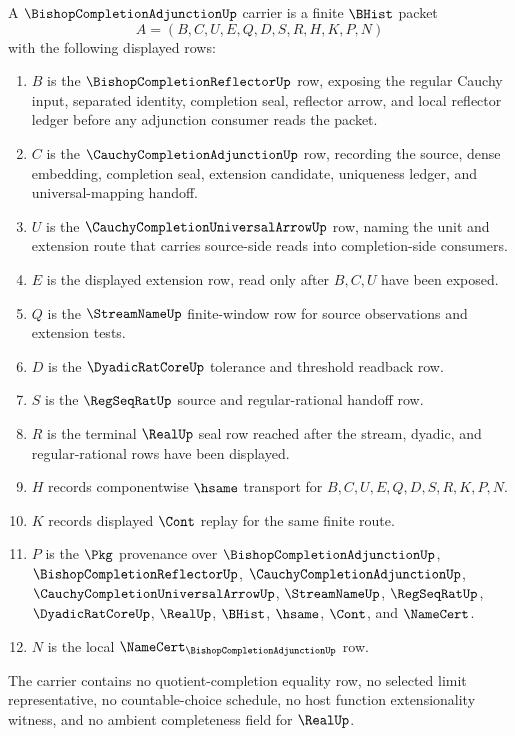 \begin{definition}
\label{def:bishop-completion-adjunction-carrier}
A $\BishopCompletionAdjunctionUp$ carrier is a finite $\BHist$ packet
$$
A=(B,C,U,E,Q,D,S,R,H,K,P,N)
$$
with the following displayed rows:
\begin{enumerate}
\item $B$ is the $\BishopCompletionReflectorUp$ row, exposing the regular Cauchy input, separated identity, completion seal, reflector arrow, and local reflector ledger before any adjunction consumer reads the packet.
\item $C$ is the $\CauchyCompletionAdjunctionUp$ row, recording the source, dense embedding, completion seal, extension candidate, uniqueness ledger, and universal-mapping handoff.
\item $U$ is the $\CauchyCompletionUniversalArrowUp$ row, naming the unit and extension route that carries source-side reads into completion-side consumers.
\item $E$ is the displayed extension row, read only after $B,C,U$ have been exposed.
\item $Q$ is the $\StreamNameUp$ finite-window row for source observations and extension tests.
\item $D$ is the $\DyadicRatCoreUp$ tolerance and threshold readback row.
\item $S$ is the $\RegSeqRatUp$ source and regular-rational handoff row.
\item $R$ is the terminal $\RealUp$ seal row reached after the stream, dyadic, and regular-rational rows have been displayed.
\item $H$ records componentwise $\hsame$ transport for $B,C,U,E,Q,D,S,R,K,P,N$.
\item $K$ records displayed $\Cont$ replay for the same finite route.
\item $P$ is the $\Pkg$ provenance over $\BishopCompletionAdjunctionUp$, $\BishopCompletionReflectorUp$, $\CauchyCompletionAdjunctionUp$, $\CauchyCompletionUniversalArrowUp$, $\StreamNameUp$, $\RegSeqRatUp$, $\DyadicRatCoreUp$, $\RealUp$, $\BHist$, $\hsame$, $\Cont$, and $\NameCert$.
\item $N$ is the local $\NameCert_{\BishopCompletionAdjunctionUp}$ row.
\end{enumerate}
The carrier contains no quotient-completion equality row, no selected limit representative, no countable-choice schedule, no host function extensionality witness, and no ambient completeness field for $\RealUp$.
\end{definition}

